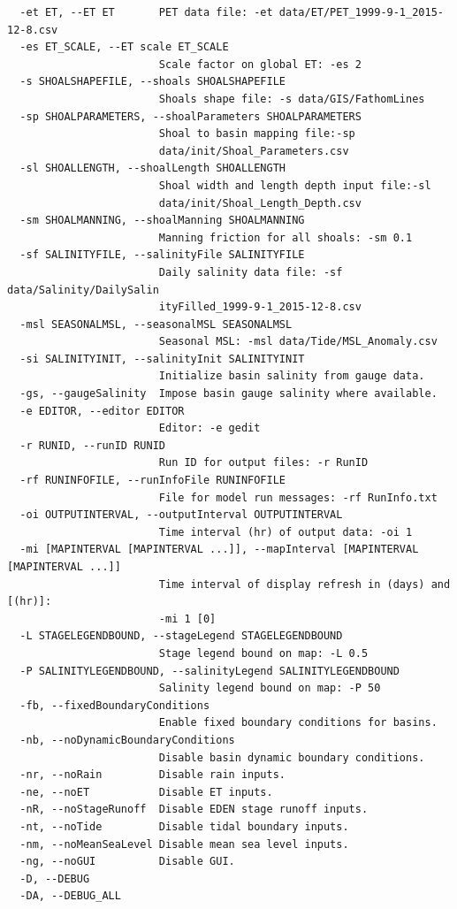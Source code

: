 \begin{verbatim}
  -et ET, --ET ET       PET data file: -et data/ET/PET_1999-9-1_2015-12-8.csv
  -es ET_SCALE, --ET scale ET_SCALE
                        Scale factor on global ET: -es 2
  -s SHOALSHAPEFILE, --shoals SHOALSHAPEFILE
                        Shoals shape file: -s data/GIS/FathomLines
  -sp SHOALPARAMETERS, --shoalParameters SHOALPARAMETERS
                        Shoal to basin mapping file:-sp
                        data/init/Shoal_Parameters.csv
  -sl SHOALLENGTH, --shoalLength SHOALLENGTH
                        Shoal width and length depth input file:-sl
                        data/init/Shoal_Length_Depth.csv
  -sm SHOALMANNING, --shoalManning SHOALMANNING
                        Manning friction for all shoals: -sm 0.1
  -sf SALINITYFILE, --salinityFile SALINITYFILE
                        Daily salinity data file: -sf data/Salinity/DailySalin
                        ityFilled_1999-9-1_2015-12-8.csv
  -msl SEASONALMSL, --seasonalMSL SEASONALMSL
                        Seasonal MSL: -msl data/Tide/MSL_Anomaly.csv
  -si SALINITYINIT, --salinityInit SALINITYINIT
                        Initialize basin salinity from gauge data.
  -gs, --gaugeSalinity  Impose basin gauge salinity where available.
  -e EDITOR, --editor EDITOR
                        Editor: -e gedit
  -r RUNID, --runID RUNID
                        Run ID for output files: -r RunID
  -rf RUNINFOFILE, --runInfoFile RUNINFOFILE
                        File for model run messages: -rf RunInfo.txt
  -oi OUTPUTINTERVAL, --outputInterval OUTPUTINTERVAL
                        Time interval (hr) of output data: -oi 1
  -mi [MAPINTERVAL [MAPINTERVAL ...]], --mapInterval [MAPINTERVAL [MAPINTERVAL ...]]
                        Time interval of display refresh in (days) and [(hr)]:
                        -mi 1 [0]
  -L STAGELEGENDBOUND, --stageLegend STAGELEGENDBOUND
                        Stage legend bound on map: -L 0.5
  -P SALINITYLEGENDBOUND, --salinityLegend SALINITYLEGENDBOUND
                        Salinity legend bound on map: -P 50
  -fb, --fixedBoundaryConditions
                        Enable fixed boundary conditions for basins.
  -nb, --noDynamicBoundaryConditions
                        Disable basin dynamic boundary conditions.
  -nr, --noRain         Disable rain inputs.
  -ne, --noET           Disable ET inputs.
  -nR, --noStageRunoff  Disable EDEN stage runoff inputs.
  -nt, --noTide         Disable tidal boundary inputs.
  -nm, --noMeanSeaLevel Disable mean sea level inputs.
  -ng, --noGUI          Disable GUI.
  -D, --DEBUG
  -DA, --DEBUG_ALL
\end{verbatim}
\large


